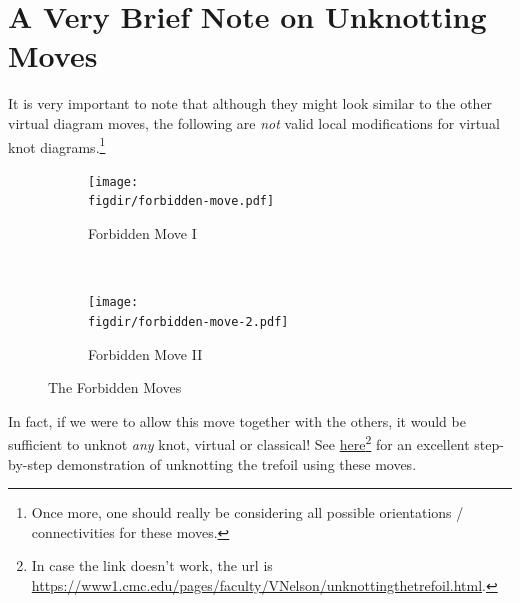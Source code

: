 \section{A Very Brief Note on Unknotting Moves}
It is very important to note that although they might look similar to
the other virtual diagram moves, the following are \emph{not} valid
local modifications for virtual knot diagrams.\footnote{Once more, one
  should really be considering all possible orientations /
  connectivities for these moves.}
\begin{figure}[H]
  \centering
  \begin{subfigure}[t]{0.5\textwidth}
    \centering
    \texttt{[image: \\figdir/forbidden-move.pdf]}
    \caption{Forbidden Move I}
  \end{subfigure}~
  \begin{subfigure}[t]{0.5\textwidth}
    \centering
    \texttt{[image: \\figdir/forbidden-move-2.pdf]}
    \caption{Forbidden Move II}
  \end{subfigure}
  \caption{The Forbidden Moves}
\end{figure}
In fact, if we were to allow this move together with the others, it
would be sufficient to unknot \emph{any} knot, virtual or classical!
See
\href{https://www1.cmc.edu/pages/faculty/VNelson/unknottingthetrefoil.html}{here}\footnote{In
  case the link doesn't work, the url is
  \url{https://www1.cmc.edu/pages/faculty/VNelson/unknottingthetrefoil.html}.}
for an excellent step-by-step demonstration of unknotting the trefoil
using these moves.

